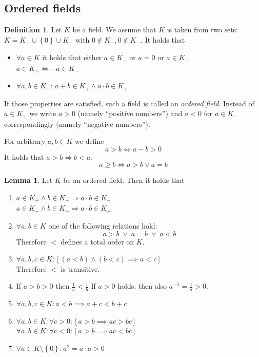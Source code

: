 \documentclass[a4paper,landscape,twocolumn]{article}
\theoremstyle{definition}
\newtheorem{defi}{Definition}
\newtheorem{lemma}{Lemma}
\newcommand\set[1]{\left\{#1\right\}}
\begin{document}
\subsection{Ordered fields}
\begin{defi}
  Let $K$ be a field. We assume that $K$ is taken from two sets: $K = K_+ \cup \set{0} \cup K_-$
  with $0 \not\in K_+, 0 \not\in K_-$. It holds that
  \begin{itemize}
    \item $\forall a \in K$ it holds that either $a \in K_-$ or $a = 0$ or $a \in K_+$ \\
          $a \in K_+ \Leftrightarrow -a \in K_-$
    \item $\forall a, b \in K_+$: $a + b \in K_+ \land a \cdot b \in K_+$
  \end{itemize}
  If those properties are satisfied, such a field is called an \emph{ordered field}.
  Instead of $a \in K_+$ we write $a > 0$ (namely \enquote{positive numbers})
  and $a < 0$ for $a \in K_-$ correspondingly (namely \enquote{negative numbers}).

  For arbitrary $a, b \in K$ we define
  \[ a > b \Leftrightarrow a - b > 0 \]
  It holds that $a > b \Leftrightarrow b < a$.
  \[ a \geq b \Leftrightarrow a > b \lor a = b \]
\end{defi}

\begin{lemma}
  Let $K$ be an ordered field. Then it holds that
  \begin{enumerate}
    \item $a \in K_+ \land b \in K_- \Rightarrow a \cdot b \in K_-$ \\
          $a \in K_- \land b \in K_- \Rightarrow a \cdot b \in K_+$
    \item $\forall a, b \in K$ one of the following relations hold:
          \[ a > b \;\lor\; a = b \;\lor\; a < b \]
          Therefore $<$ defines a total order on $K$.
    \item $\forall a, b, c \in K: \left[(a < b) \land (b < c) \implies a < c\right]$ \\
          Therefore $<$ is transitive.
    \item If $a > b > 0$ then $\frac1a < \frac1b$
          If $a > 0$ holds, then also $a^{-1} = \frac1a > 0$.
    \item $\forall a, b, c \in K: a < b \implies a + c < b + c$
    \item $\forall a, b \in K: \forall c > 0: \left[a > b \implies ac > bc\right]$ \\
          $\forall a, b \in K: \forall c < 0: \left[a > b \implies ac < bc\right]$
    \item $\forall a \in K \setminus \set{0}: a^2 = a \cdot a > 0$
  \end{enumerate}
\end{lemma}
\end{document}
